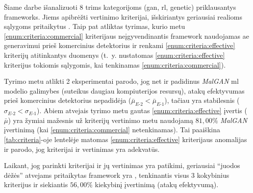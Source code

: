 
Šiame darbe išanalizuoti 8 trims kategorijoms (\acs{gan}, \acs{rl}, \acs{genetic}) priklausantys  \glspl{framework}. Jiems apibrėžti vertinimo kriterijai, išskiriantys geriausiai realioms sąlygoms pritaikytus . Taip pat atliktas tyrimas, kurio metu \ref{enum:criteria:commercial} kriterijaus neįgyvendinantis \gls{framework}  naudojamas \acs{ae} generavimui prieš komercinius detektorius ir renkami \ref{enum:criteria:effective} kriterijų atitinkantys duomenys (t.~y. nustatomas  \ref{enum:criteria:effective} kriterijus tokiomis sąlygomis, kai tenkinamas \ref{enum:criteria:commercial}).

Tyrimo metu atlikti 2 eksperimentai parodo, jog net ir padidinus \textit{MalGAN} \acs{ml} modelio galimybes (suteikus daugiau kompiuterijos resursų), atakų efektyvumas prieš komercinius detektorius nepadidėja ($\bar{\mu}_{E \text{-} 2} < \bar{\mu}_{E \text{-} 1}$), tačiau yra stabilesnis ($\sigma_{E \text{-} 2} < \sigma_{E \text{-} 1}$). Abiem atvejais tyrimo metu gautas \ref{enum:criteria:effective} įvertis ($\bar{\mu}$) yra žymiai mažesnis už kriterijų vertinimo metu naudojamą $81,00\%$ \textit{MalGAN}  įvertinimą (kai \ref{enum:criteria:commercial} netenkinamas). Tai paaiškina \ref{tab:criteria}-oje lentelėje matomas \ref{enum:criteria:effective} kriterijaus anomalijas ir parodo, jog kriterijai ir  vertinimas yra adekvatūs.

Laikant, jog parinkti kriterijai ir jų vertinimas yra patikimi, geriausiai \enquote{juodos dėžės} atvejams pritaikytas \gls{framework} yra , tenkinantis visus 3 kokybinius kriterijus ir siekiantis $56,00\%$ kiekybinį įvertinimą (atakų efektyvumą).